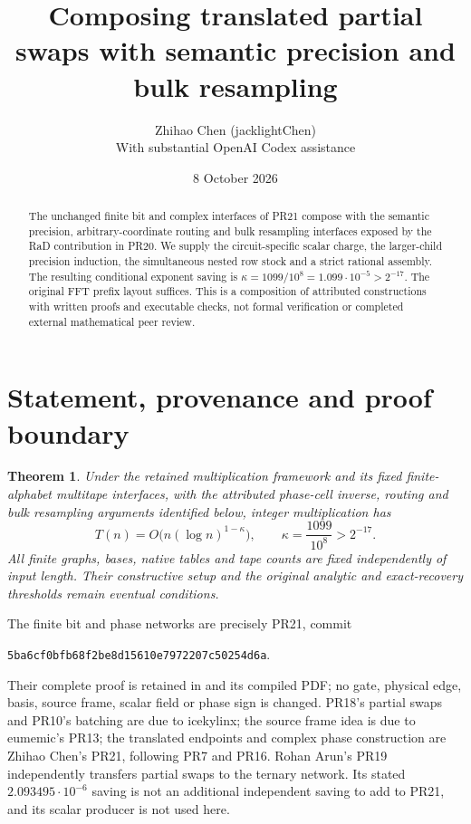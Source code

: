 \documentclass[11pt]{article}
\title{Composing translated partial swaps with semantic precision and bulk resampling}
\author{Zhihao Chen (jacklightChen)\\\small With substantial OpenAI Codex assistance}
\date{8 October 2026}
\newtheorem{theorem}{Theorem}
\begin{document}
\maketitle
\begin{abstract}
The unchanged finite bit and complex interfaces of PR21 compose with the
semantic precision, arbitrary-coordinate routing and bulk resampling
interfaces exposed by the RaD contribution in PR20. We supply the
circuit-specific scalar charge, the larger-child precision induction,
the simultaneous nested row stock and a strict rational assembly.
The resulting conditional exponent saving is
$\kappa=1099/10^8=1.099\cdot10^{-5}>2^{-17}$.
The original FFT prefix layout suffices. This is a composition of attributed
constructions with written proofs and executable checks, not formal
verification or completed external mathematical peer review.
\end{abstract}

\section{Statement, provenance and proof boundary}
\begin{theorem}
Under the retained multiplication framework and its fixed finite-alphabet
multitape interfaces, with the attributed phase-cell inverse, routing and
bulk resampling arguments identified below, integer multiplication has
\[
 T(n)=O\bigl(n(\log n)^{1-\kappa}\bigr),\qquad
 \boxed{\kappa=\frac{1099}{10^8}>2^{-17}}.
\]
All finite graphs, bases, native tables and tape counts are fixed
independently of input length. Their constructive setup and the original
analytic and exact-recovery thresholds remain eventual conditions.
\end{theorem}

The finite bit and phase networks are precisely PR21, commit\par\noindent
\texttt{5ba6cf0bfb68f2be8d15610e7972207c50254d6a}.

Their complete proof is retained in
 and its compiled PDF; no gate,
physical edge, basis, source frame, scalar field or phase sign is changed.
PR18's partial swaps and PR10's batching are due to icekylinx; the source
frame idea is due to eumemic's PR13; the translated endpoints and complex
phase construction are Zhihao Chen's PR21, following PR7 and PR16.
Rohan Arun's PR19 independently transfers partial swaps to the ternary
network. Its stated $2.093495\cdot10^{-6}$ saving is not an additional
independent saving to add to PR21, and its scalar producer is not used here.
\end{document}
